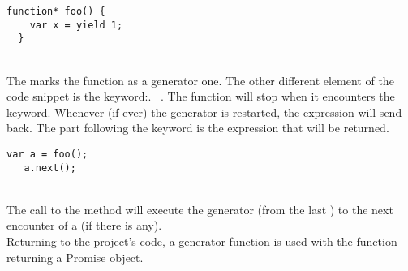 \documentclass[11pt, a4paper, twoside, openright]{book} %
\begin{document}
\begin{lstlisting}[caption={Structure of a generator function}, captionpos=b]
  function* foo() {
    var x = yield 1;
  }
  \end{lstlisting}
\leavevmode \\
The \say{*} marks the function as a generator one. The other different element of
the code snippet is the keyword:. 
~\cite{yieldExpression}. The function will stop when it encounters the  keyword.
Whenever (if ever) the generator is restarted, the  expression will send  back.
The part following the  keyword is the expression that will be returned.\\

 \begin{lstlisting}[caption={Restart of a generator function}, captionpos=b]
   var a = foo();
   a.next();
 \end{lstlisting}
 \leavevmode \\
The call to the  method will execute the generator (from the last ) to the next encounter of a  (if there is any).\\
Returning to the project's code, a generator function is used with the function returning a Promise object.\\
\end{document}
